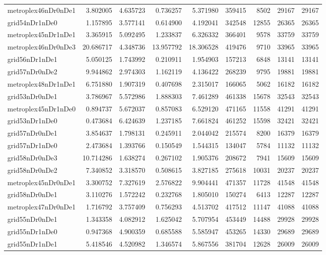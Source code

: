\begin{longtable}{|l|r|r|r|r|r|r|r|r|}
metroplex46nDr0nDe1 & 3.802005 & 4.635723 & 0.736257 & 5.371980 & 359415 & 8502 & 29167 & 29167 \\
grid54nDr1nDe0 & 1.157895 & 3.577141 & 0.614900 & 4.192041 & 342548 & 12855 & 26365 & 26365 \\
metroplex45nDr1nDe1 & 3.365915 & 5.092495 & 1.233837 & 6.326332 & 366401 & 9578 & 33759 & 33759 \\
metroplex46nDr0nDe3 & 20.686717 & 4.348736 & 13.957792 & 18.306528 & 419476 & 9710 & 33965 & 33965 \\
grid56nDr1nDe1 & 5.050125 & 1.743992 & 0.210911 & 1.954903 & 157213 & 6848 & 13141 & 13141 \\
grid57nDr0nDe2 & 9.944862 & 2.974303 & 1.162119 & 4.136422 & 268239 & 9795 & 19881 & 19881 \\
metroplex48nDr1nDe1 & 6.751880 & 1.907319 & 0.407698 & 2.315017 & 166065 & 5062 & 16182 & 16182 \\
grid53nDr0nDe1 & 3.786967 & 5.572986 & 1.888303 & 7.461289 & 461338 & 15678 & 32543 & 32543 \\
metroplex45nDr1nDe0 & 0.894737 & 5.672037 & 0.857083 & 6.529120 & 471165 & 11558 & 41291 & 41291 \\
grid53nDr1nDe0 & 0.473684 & 6.424639 & 1.237185 & 7.661824 & 461252 & 15598 & 32421 & 32421 \\
grid57nDr0nDe1 & 3.854637 & 1.798131 & 0.245911 & 2.044042 & 215574 & 8200 & 16379 & 16379 \\
grid57nDr1nDe0 & 2.473684 & 1.393766 & 0.150549 & 1.544315 & 134047 & 5784 & 11132 & 11132 \\
grid58nDr0nDe3 & 10.714286 & 1.638274 & 0.267102 & 1.905376 & 208672 & 7941 & 15609 & 15609 \\
grid58nDr0nDe2 & 7.340852 & 3.318570 & 0.508615 & 3.827185 & 275618 & 10031 & 20237 & 20237 \\
metroplex45nDr0nDe1 & 3.300752 & 7.327619 & 2.576822 & 9.904441 & 471357 & 11728 & 41548 & 41548 \\
grid58nDr0nDe1 & 3.110276 & 1.572242 & 0.232768 & 1.805010 & 150274 & 6413 & 12287 & 12287 \\
metroplex47nDr0nDe1 & 1.716792 & 3.757409 & 0.756293 & 4.513702 & 417512 & 11147 & 41088 & 41088 \\
grid55nDr0nDe1 & 1.343358 & 4.082912 & 1.625042 & 5.707954 & 453449 & 14488 & 29928 & 29928 \\
grid55nDr1nDe0 & 0.947368 & 4.900359 & 0.685588 & 5.585947 & 453265 & 14330 & 29689 & 29689 \\
grid55nDr1nDe1 & 5.418546 & 4.520982 & 1.346574 & 5.867556 & 381704 & 12628 & 26009 & 26009 \\

\end{longtable}
